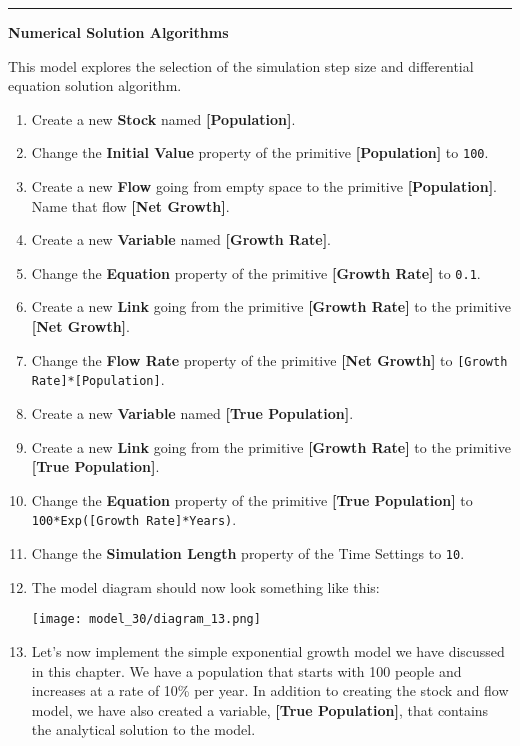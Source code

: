\documentclass[]{memoir}
\makeatletter
\def\maxwidth{\ifdim\Gin@nat@width>\linewidth\linewidth
\else\Gin@nat@width\fi}
\let\Oldincludegraphics\includegraphics
\renewcommand{\includegraphics}[1]{\Oldincludegraphics[width=\maxwidth]{#1}}
\newcommand{\p}[1]{\textbf{{[}#1{]}}}
\newcommand{\e}[1]{\texttt{#1}}
\renewcommand{\a}[1]{\textbf{#1}}
\makeatother
\begin{document}
\begin{center}\rule{3in}{0.4pt}\end{center}

\FloatBarrier 

\begin{oframed}\textbf{Numerical Solution Algorithms} 

 This model explores the selection of the simulation step size and differential equation solution algorithm.

\begin{enumerate}
\item Create a new \a{Stock} named \p{Population}.
\item  Change the \a{Initial Value} property of the primitive \p{Population} to \e{100}.
\item Create a new \a{Flow} going from empty space to the primitive \p{Population}. Name that flow \p{Net Growth}.
\item Create a new \a{Variable} named \p{Growth Rate}.
\item  Change the \a{Equation} property of the primitive \p{Growth Rate} to \e{0.1}.
\item Create a new \a{Link} going from the primitive \p{Growth Rate} to the primitive \p{Net Growth}.
\item  Change the \a{Flow Rate} property of the primitive \p{Net Growth} to \e{[Growth Rate]*[Population]}.
\item Create a new \a{Variable} named \p{True Population}.
\item Create a new \a{Link} going from the primitive \p{Growth Rate} to the primitive \p{True Population}.
\item  Change the \a{Equation} property of the primitive \p{True Population} to \e{100*Exp([Growth Rate]*Years)}.
\item  Change the \a{Simulation Length} property of the Time Settings to \e{10}.
\item The model diagram should now look something like this: \par \begin{minipage}{\linewidth}  \centering \texttt{[image: model\_30/diagram\_13.png]}
\end{minipage}
\item 

Let's now implement the simple exponential growth model we have discussed in this chapter. We have a population that starts with 100 people and increases at a rate of 10\% per year. In addition to creating the stock and flow model, we have also created a variable, \p{True Population}, that contains the analytical solution to the model.



\end{enumerate}
\end{oframed}
\end{document}

